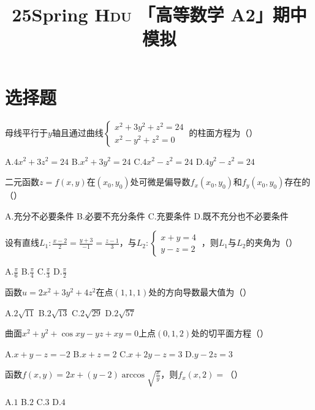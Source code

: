\documentclass[quiet]{ctexart}
\title{\sffamily\bfseries 25Spring \textsc{Hdu} 「高等数学 A2」期中模拟}
\author{} \date{}
\begin{document}
\section{选择题}

\begin{problem}
  母线平行于$y$轴且通过曲线$\left\{ \begin{array}{r}
    x^{2} + 3y^{2} + z^{2} = 24 \\
    x^{2} - y^{2} + z^{2} = 0
    \end{array} \right.\ $的柱面方程为（）
    
    A.$4x^{2} + 3z^{2} = 24$ \quad B.$x^{2} + 3y^{2} = 24$ \quad C.$4x^{2} - z^{2} = 24$ \quad D.$4y^{2} - z^{2} = 24$
\end{problem}

\begin{problem}
  二元函数$z = f(x,y)$在$(x_{0},y_{0})$处可微是偏导数$f_{x}(x_{0},y_{0})$和$f_{y}(x_{0},y_{0})$存在的（）
        
        A.充分不必要条件 \quad B.必要不充分条件 \quad C.充要条件 \quad D.既不充分也不必要条件
\end{problem}

\begin{problem}
  设有直线$L_{1}: \frac{x - 2}{2} = \frac{y + 3}{- 1} = \frac{z - 1}{3}$，与$L_{2}: \left\{ \begin{array}{r}
    x + y = 4 \\
    y - z = 2
    \end{array} \right.\ $，则$L_{1}$与$L_{2}$的夹角为（）
    
    A.$\frac{\pi}{6}$ \quad B.$\frac{\pi}{4}$ \quad C.$\frac{\pi}{3}$ \quad D.$\frac{\pi}{2}$
\end{problem}

\begin{problem}
  函数$u = 2x^{2} + 3y^{2} + 4z^{2}$在点$(1,1,1)$处的方向导数最大值为（）
        
        A.$2\sqrt{11}$ \quad B.$2\sqrt{13}$ \quad C.$2\sqrt{29}$ \quad D.$2\sqrt{57}$
\end{problem}

\begin{problem}
  曲面$x^{2} + y^{2} + \cos{xy} - yz + xy = 0$上点$(0,1,2)$处的切平面方程（）
        
        A.$x + y - z = - 2$ \quad B.$x + z = 2$ \quad C.$x + 2y - z = 3$ \quad D.$y - 2z = 3$
\end{problem}

\begin{problem}
  函数$f(x,y) = 2x + (y - 2)\arccos\sqrt{\frac{x}{y}}$，则$f_{x}(x,2) =$（）
        
        A.$1$ \quad B.$2$ \quad C.$3$ \quad D.$4$
\end{problem}
\end{document}
